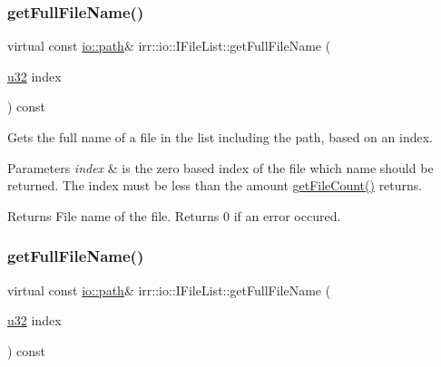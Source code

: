\subsubsection{\texorpdfstring{get\+Full\+File\+Name()}{getFullFileName()}\hspace{0.1cm}{\footnotesize\ttfamily [1/2]}}
{\footnotesize\ttfamily virtual const \hyperlink{namespaceirr_1_1io_a6468281622ce3a1c46b72e19f32dded5}{io\+::path}\& irr\+::io\+::\+I\+File\+List\+::get\+Full\+File\+Name (\begin{DoxyParamCaption}\item[{\hyperlink{namespaceirr_a0416a53257075833e7002efd0a18e804}{u32}}]{index }\end{DoxyParamCaption}) const\hspace{0.3cm}{\ttfamily [pure virtual]}}



Gets the full name of a file in the list including the path, based on an index. 


\begin{DoxyParams}{Parameters}
{\em index} & is the zero based index of the file which name should be returned. The index must be less than the amount \hyperlink{classirr_1_1io_1_1IFileList_a871861be76e18d58274c4580b1d103b9}{get\+File\+Count()} returns. \\
\hline
\end{DoxyParams}
\begin{DoxyReturn}{Returns}
File name of the file. Returns 0 if an error occured. 
\end{DoxyReturn}
\mbox{\label{classirr_1_1io_1_1IFileList_a063c823f58019bda79efabefabe365da}} 
\subsubsection{\texorpdfstring{get\+Full\+File\+Name()}{getFullFileName()}\hspace{0.1cm}{\footnotesize\ttfamily [2/2]}}
{\footnotesize\ttfamily virtual const \hyperlink{namespaceirr_1_1io_a6468281622ce3a1c46b72e19f32dded5}{io\+::path}\& irr\+::io\+::\+I\+File\+List\+::get\+Full\+File\+Name (\begin{DoxyParamCaption}\item[{\hyperlink{namespaceirr_a0416a53257075833e7002efd0a18e804}{u32}}]{index }\end{DoxyParamCaption}) const\hspace{0.3cm}{\ttfamily [pure virtual]}}



